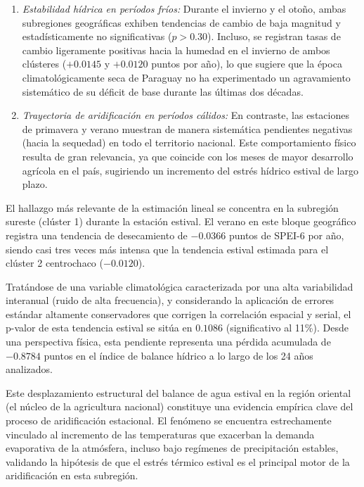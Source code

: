 \begin{enumerate}
    \item \textit{Estabilidad hídrica en períodos fríos:} Durante el invierno y el otoño, ambas subregiones geográficas exhiben tendencias de cambio de baja magnitud y estadísticamente no significativas ($p > 0.30$). Incluso, se registran tasas de cambio ligeramente positivas hacia la humedad en el invierno de ambos clústeres ($+0.0145$ y $+0.0120$ puntos por año), lo que sugiere que la época climatológicamente seca de Paraguay no ha experimentado un agravamiento sistemático de su déficit de base durante las últimas dos décadas.
    \item \textit{Trayectoria de aridificación en períodos cálidos:} En contraste, las estaciones de primavera y verano muestran de manera sistemática pendientes negativas (hacia la sequedad) en todo el territorio nacional. Este comportamiento físico resulta de gran relevancia, ya que coincide con los meses de mayor desarrollo agrícola en el país, sugiriendo un incremento del estrés hídrico estival de largo plazo.
\end{enumerate}

El hallazgo más relevante de la estimación lineal se concentra en la subregión sureste (clúster 1) durante la estación estival. El verano en este bloque geográfico registra una tendencia de desecamiento de ${-0.0366}$ puntos de SPEI-6 por año, siendo casi tres veces más intensa que la tendencia estival estimada para el clúster 2 centrochaco ($-0.0120$). 

Tratándose de una variable climatológica caracterizada por una alta variabilidad interanual (ruido de alta frecuencia), y considerando la aplicación de errores estándar altamente conservadores que corrigen la correlación espacial y serial, el p-valor de esta tendencia estival se sitúa en $0.1086$ (significativo al 11\%). Desde una perspectiva física, esta pendiente representa una pérdida acumulada de ${-0.8784}$ puntos en el índice de balance hídrico a lo largo de los 24 años analizados. 

Este desplazamiento estructural del balance de agua estival en la región oriental (el núcleo de la agricultura nacional) constituye una evidencia empírica clave del proceso de aridificación estacional. El fenómeno se encuentra estrechamente vinculado al incremento de las temperaturas que exacerban la demanda evaporativa de la atmósfera, incluso bajo regímenes de precipitación estables, validando la hipótesis de que el estrés térmico estival es el principal motor de la aridificación en esta subregión.

